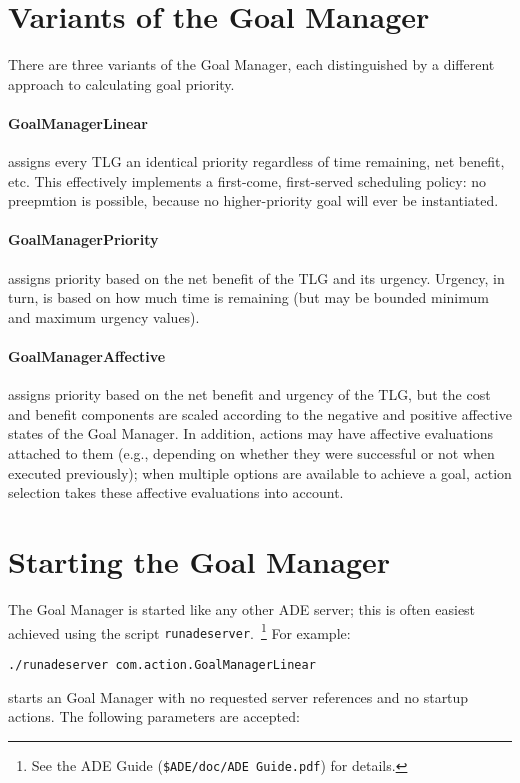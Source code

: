 \documentclass[11pt,letterpaper]{article}
\begin{document}
\section{Variants of the Goal Manager}

There are three variants of the Goal Manager, each distinguished by
a different approach to calculating goal priority.

\paragraph{GoalManagerLinear} assigns every TLG an identical
priority regardless of time remaining, net benefit, etc.  This
effectively implements a first-come, first-served scheduling policy:
no preepmtion is possible, because no higher-priority goal will ever
be instantiated.

\paragraph{GoalManagerPriority} assigns priority based on the net
benefit of the TLG and its urgency.  Urgency, in turn, is based on
how much time is remaining (but may be bounded minimum and maximum
urgency values).

\paragraph{GoalManagerAffective} assigns priority based on the net
benefit and urgency of the TLG, but the cost and benefit components
are scaled according to the negative and positive affective states of
the Goal Manager.  In addition, actions may have affective
evaluations attached to them (e.g., depending on whether they were
successful or not when executed previously); when multiple options are
available to achieve a goal, action selection takes these affective
evaluations into account.

\section{Starting the Goal Manager}

The Goal Manager is started like any other ADE server; this is often
easiest achieved using the script {\tt runadeserver}.~\footnote{See the ADE
Guide ({\tt \$ADE/doc/ADE Guide.pdf}) for details.}  For example:

{\tt ./runadeserver com.action.GoalManagerLinear}

\noindent starts an Goal Manager with no requested server references
and no startup actions.  The following parameters are accepted:
\end{document}
